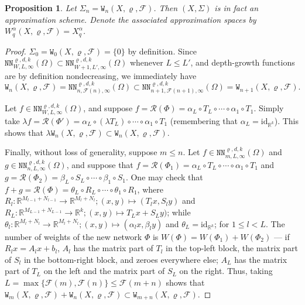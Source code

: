 \documentclass{article}
\newtheorem{proposition}[theorem]{Proposition}
\theoremstyle{definition}
\theoremstyle{remark}
\begin{document}
\begin{proposition}
    Let $\Sigma_n = \mathtt{W}_n(X,\varrho,\mathcal{F})$. Then $(X,\Sigma)$ is in fact an approximation scheme. Denote the associated approximation spaces by $W_q^\alpha(X,\varrho,\mathcal{F}) = X_q^\alpha$.
\end{proposition}

\begin{proof}
    $\Sigma_0 = \mathtt{W}_0(X,\varrho,\mathcal{F}) = \{ 0 \}$ by definition. Since $\mathtt{NN}_{W,L,\infty}^{\varrho,d,k}(\Omega) \subset \mathtt{NN}_{W+1,L',\infty}^{\varrho,d,k}(\Omega)$ whenever $L \leq L'$, and depth-growth functions are by definition nondecreasing, we immediately have
    \[\mathtt{W}_n(X,\varrho,\mathcal{F}) = \mathtt{NN}_{n,\mathcal{F}(n),\infty}^{\varrho,d,k}(\Omega) \subset \mathtt{NN}_{n+1,\mathcal{F}(n+1),\infty}^{\varrho,d,k}(\Omega) = \mathtt{W}_{n+1}(X,\varrho,\mathcal{F}).\]
    
    Let $f \in \mathtt{NN}_{W,L,\infty}^{\varrho,d,k}(\Omega)$, and suppose $f = \mathcal{R}(\Phi) = \alpha_L \circ T_L \circ \cdots \circ \alpha_1 \circ T_1$. Simply take $\lambda f = \mathcal{R}(\Phi') = \alpha_L \circ (\lambda T_L) \circ \cdots \circ \alpha_1 \circ T_1$ (remembering that $\alpha_L = \mathrm{id}_{\mathbb{R}^k}$). This shows that $\lambda\mathtt{W}_n(X,\varrho,\mathcal{F}) \subset \mathtt{W}_n(X,\varrho,\mathcal{F})$.

    Finally, without loss of generality, suppose $m \leq n$. Let $f \in \mathtt{NN}_{m,L,\infty}^{\varrho,d,k}(\Omega)$ and $g \in \mathtt{NN}_{n,L,\infty}^{\varrho,d,k}(\Omega)$, and suppose that $f = \mathcal{R}(\Phi_1) = \alpha_L \circ T_L \circ \cdots \circ \alpha_1 \circ T_1$ and $g = \mathcal{R}(\Phi_2) = \beta_L \circ S_L \circ \cdots \circ \beta_1 \circ S_1$. One may check that $f+g = \mathcal{R}(\Phi) = \theta_L \circ R_L \circ \cdots \circ \theta_1 \circ R_1$, where $R_l: \mathbb{R}^{M_{l-1}+N_{l-1}} \to \mathbb{R}^{M_l+N_l}; (x,y) \mapsto (T_lx,S_ly)$ and $R_L: \mathbb{R}^{M_{L-1}+N_{L-1}} \to \mathbb{R}^k; (x,y) \mapsto T_Lx+S_Ly)$; while $\theta_l: \mathbb{R}^{M_l+N_l} \to \mathbb{R}^{M_l+N_l}; (x,y) \mapsto (\alpha_lx,\beta_ly)$ and $\theta_L = \mathrm{id}_{\mathbb{R}^k}$; for $1 \leq l < L$. The number of weights of the new network $\Phi$ is $W(\Phi) = W(\Phi_1)+W(\Phi_2)$ --- if $R_lx = A_lx+b_l$, $A_l$ has the matrix part of $T_l$ in the top-left block, the matrix part of $S_l$ in the bottom-right block, and zeroes everywhere else; $A_L$ has the matrix part of $T_L$ on the left and the matrix part of $S_L$ on the right. Thus, taking $L = \max \{ \mathcal{F}(m),\mathcal{F}(n) \} \leq \mathcal{F}(m+n)$ shows that $\mathtt{W}_m(X,\varrho,\mathcal{F})+\mathtt{W}_n(X,\varrho,\mathcal{F}) \subset \mathtt{W}_{m+n}(X,\varrho,\mathcal{F})$.
\end{proof}
\end{document}
